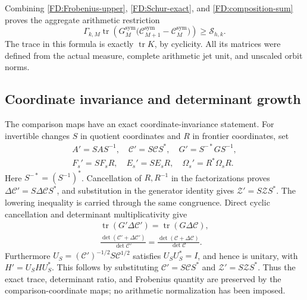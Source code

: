 Combining \eqref{FD:Frobenius-upper}, \eqref{FD:Schur-exact}, and
\eqref{FD:composition-sum} proves the aggregate arithmetic restriction
\begin{equation}
\boxed{\Gamma_{k,M}\operatorname{tr}\!\left(
G_M^{\mathrm{sym}}\bigl(\mathcal C_{M+1}^{\mathrm{sym}}
-\mathcal C_M^{\mathrm{sym}}\bigr)\right)\ge\mathcal S_{h,k}.}
\tag{FD.34}\label{FD:aggregate-bound}
\end{equation}
The trace in this formula is exactly \(\operatorname{tr}K\), by
cyclicity.  All its matrices were defined from the actual measure,
complete arithmetic jet unit, and unscaled orbit norms.

\subsection{Coordinate invariance and determinant growth}

The comparison maps have an exact coordinate-invariance statement.
For invertible changes \(S\) in quotient coordinates and \(R\) in
frontier coordinates, set
\begin{equation}
\begin{gathered}
A'=SAS^{-1},\quad \mathcal C'=S\mathcal CS^*,\quad
G'=S^{-*}GS^{-1},\\
F_s'=SF_sR,\quad E_s'=SE_sR,\quad
\Omega_s'=R^*\Omega_sR.
\end{gathered}
\tag{FD.35}\label{FD:coordinate-change}
\end{equation}
Here \(S^{-*}=(S^{-1})^*\).  Cancellation of \(R,R^{-1}\) in the
factorizations proves \(\Delta\mathcal C'=S\Delta\mathcal CS^*\),
and substitution in the generator identity gives
\(\mathcal Z'=S\mathcal ZS^*\).  The lowering inequality is carried
through the same congruence.  Direct cyclic cancellation and determinant
multiplicativity give
\begin{equation}
\begin{gathered}
\operatorname{tr}(G'\Delta\mathcal C')
=\operatorname{tr}(G\Delta\mathcal C),\\
\frac{\det(\mathcal C'+\Delta\mathcal C')}{\det\mathcal C'}
=\frac{\det(\mathcal C+\Delta\mathcal C)}{\det\mathcal C}.
\end{gathered}
\tag{FD.36}\label{FD:coordinate-invariants}
\end{equation}
Furthermore
\(U_S=(\mathcal C')^{-1/2}S\mathcal C^{1/2}\) satisfies
\(U_SU_S^*=I\), and hence is unitary, with
\(H'=U_SHU_S^*\).  This follows by substituting
\(\mathcal C'=S\mathcal CS^*\) and
\(\mathcal Z'=S\mathcal ZS^*\).
Thus the exact trace, determinant ratio, and Frobenius quantity are
preserved by the comparison-coordinate maps; no arithmetic
normalization has been imposed.


